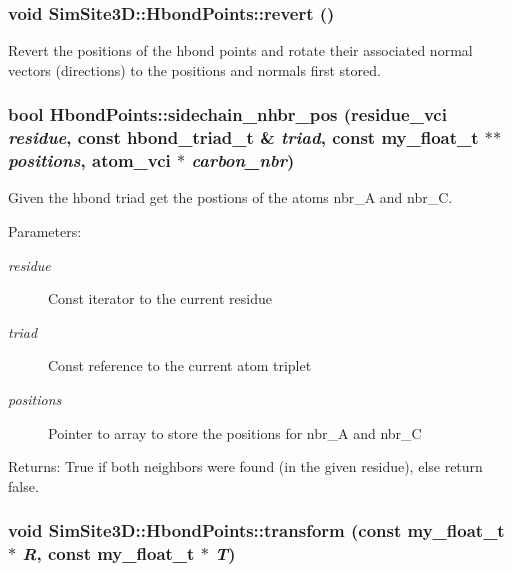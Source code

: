 \subsubsection{\setlength{\rightskip}{0pt plus 5cm}void SimSite3D::Hbond\-Points::revert ()\hspace{0.3cm}{\tt  [inline]}}\label{classSimSite3D_1_1HbondPoints_cf6e668fee3d6d59bb7a1205db1c8a84}


Revert the positions of the hbond points and rotate their associated normal vectors (directions) to the positions and normals first stored. 
\subsubsection{\setlength{\rightskip}{0pt plus 5cm}bool Hbond\-Points::sidechain\_\-nhbr\_\-pos (residue\_\-vci {\em residue}, const \bf{hbond\_\-triad\_\-t} \& {\em triad}, const my\_\-float\_\-t $\ast$$\ast$ {\em positions}, atom\_\-vci $\ast$ {\em carbon\_\-nbr})\hspace{0.3cm}{\tt  [private]}}\label{classSimSite3D_1_1HbondPoints_d0b52b652b7ec3367efa7d507b10d663}


Given the hbond triad get the postions of the atoms nbr\_\-A and nbr\_\-C. 

\begin{Desc}
\item[Parameters:]
\begin{description}
\item[{\em residue}]Const iterator to the current residue \item[{\em triad}]Const reference to the current atom triplet \item[{\em positions}]Pointer to array to store the positions for nbr\_\-A and nbr\_\-C \end{description}
\end{Desc}
\begin{Desc}
\item[Returns:]True if both neighbors were found (in the given residue), else return false. \end{Desc}
\subsubsection{\setlength{\rightskip}{0pt plus 5cm}void SimSite3D::Hbond\-Points::transform (const my\_\-float\_\-t $\ast$ {\em R}, const my\_\-float\_\-t $\ast$ {\em T})\hspace{0.3cm}{\tt  [inline]}}\label{classSimSite3D_1_1HbondPoints_2b4848ccd8ce2fed483e32ac356ebe12}


